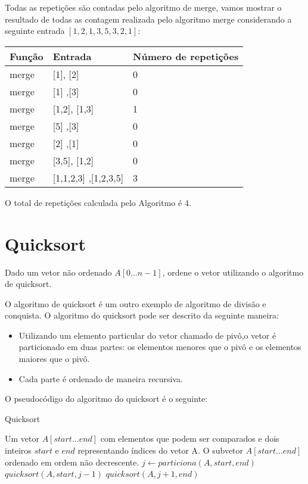 Todas as repetições são contadas pelo algoritmo de merge, vamos mostrar o resultado de todas as contagem realizada pelo algoritmo merge considerando a seguinte entrada  $[1,2,1,3,5,3,2,1]$:

\begin{center}
\begin{tabular}{l|l|l}
Função    & Entrada & Número de repetições\\
\hline 
merge     &  [1], [2] & 0 \\
merge     &  [1] ,[3] & 0 \\
merge     &  [1,2], [1,3] & 1 \\
merge     &  [5] ,[3] & 0 \\
merge     &  [2] ,[1] & 0 \\
merge     &  [3,5], [1,2] & 0 \\
merge     &  [1,1,2,3] ,[1,2,3,5] & 3 \\
\end{tabular}
\end{center}

O total de repetições calculada pelo Algoritmo é 4.

\section{Quicksort}

\begin{exemplo}
Dado um vetor não ordenado $A[0 \ldots n-1]$, ordene o vetor utilizando o algoritmo de quicksort.
\end{exemplo}


O algoritmo de quicksort é um outro exemplo de algoritmo de divisão e conquista. O algoritmo do quicksort pode ser descrito da seguinte maneira:

\begin{itemize}
    \item Utilizando um elemento particular do vetor chamado de pivô,o vetor é particionado em duas partes: os elementos menores que o pivô e os elementos maiores que o pivô.
    \item Cada parte é ordenado de maneira recursiva.
\end{itemize}

O pseudocódigo do algoritmo do quicksort é o seguinte:


\begin{algorithm}
\caption{Quicksort}
\label{alg::quicksort}

\begin{algorithmic}
\Require Um vetor $A[start \ldots end]$ com elementos que podem ser comparados e dois inteiros $start$ e $end$ representando índices do vetor A.
\Ensure O subvetor $A[start \ldots end]$ ordenado em ordem não decrescente.
    \State $j \gets particiona(A, start, end)$
    \State $quicksort(A, start, j-1 )$
    \State $quicksort(A, j + 1, end )$
\EndIf
\end{algorithmic}
\end{algorithm}


